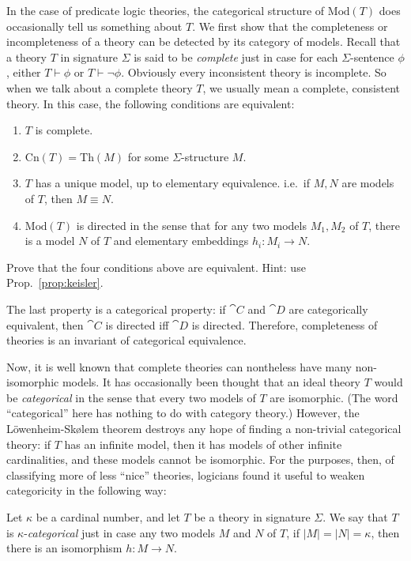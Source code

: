 In the case of predicate logic theories, the categorical structure of
$\mathrm{Mod}(T)$ does occasionally tell us something about $T$.  We
first show that the completeness or incompleteness of a theory can be
detected by its category of models.  Recall that a theory $T$ in
signature $\Sigma$ is said to be \emph{complete} just in case for each
$\Sigma$-sentence $\phi$, either $T\vdash\phi$ or $T\vdash\neg\phi$.
Obviously every inconsistent theory is incomplete.  So when we talk
about a complete theory $T$, we usually mean a complete, consistent
theory.  In this case, the following conditions are equivalent:
  \begin{enumerate}
 \item $T$ is complete.
  \item $\mathrm{Cn}(T)=\mathrm{Th}(M)$ for some $\Sigma$-structure
  $M$.
\item $T$ has a unique model, up to elementary equivalence.  i.e.\ if
  $M,N$ are models of $T$, then $M\equiv N$.
\item $\mathrm{Mod}(T)$ is directed in the sense that for any two
  models $M_1,M_2$ of $T$, there is a model $N$ of $T$ and elementary
  embeddings $h_i:M_i\to N$.\end{enumerate}

\begin{exercise} Prove that the four conditions above are equivalent.
  Hint: use Prop.\ \ref{prop:keisler}. \end{exercise}


The last property is a categorical property: if $\cat{C}$ and
$\cat{D}$ are categorically equivalent, then $\cat{C}$ is directed iff
$\cat{D}$ is directed.  Therefore, completeness of theories is an
invariant of categorical equivalence.

Now, it is well known that complete theories can nontheless have many
non-isomorphic models.  It has occasionally been thought that an ideal
theory $T$ would be \emph{categorical} in the sense that every two
models of $T$ are isomorphic.  (The word ``categorical'' here has
nothing to do with category theory.)  However, the
L{\"o}wenheim-Sk{\o}lem theorem destroys any hope of finding a
non-trivial categorical theory: if $T$ has an infinite model, then it
has models of other infinite cardinalities, and these models cannot be
isomorphic.  For the purposes, then, of classifying more of less
``nice'' theories, logicians found it useful to weaken categoricity in
the following way:

\begin{defn} Let $\kappa$ be a cardinal number, and let $T$ be a
  theory in signature $\Sigma$.  We say that $T$ is
  $\kappa$-\emph{categorical} just in case any two models $M$ and $N$
  of $T$, if $|M|=|N|=\kappa$, then there is an isomorphism
  $h:M\to N$. \end{defn}

